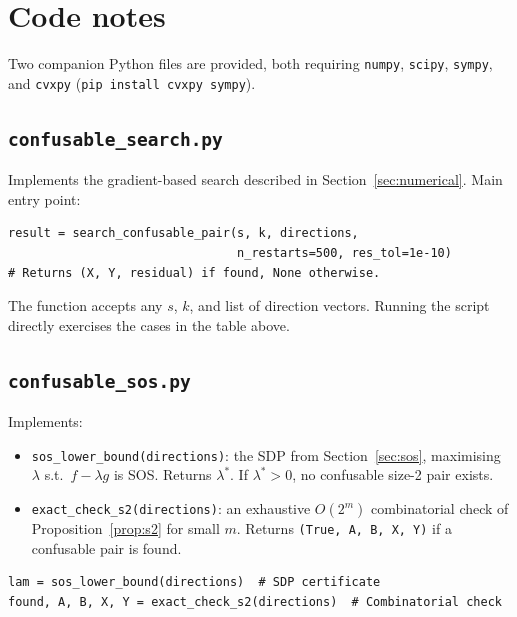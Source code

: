 \documentclass[12pt,a4paper]{article}
\begin{document}
\section{Code notes}
\label{sec:code}

Two companion Python files are provided, both requiring \texttt{numpy},
\texttt{scipy}, \texttt{sympy}, and \texttt{cvxpy} (\texttt{pip install
cvxpy sympy}).

\subsection*{\texttt{confusable\_search.py}}

Implements the gradient-based search described in
Section~\ref{sec:numerical}.  Main entry point:

\begin{lstlisting}
result = search_confusable_pair(s, k, directions,
                                n_restarts=500, res_tol=1e-10)
# Returns (X, Y, residual) if found, None otherwise.
\end{lstlisting}

The function accepts any $s$, $k$, and list of direction vectors.
Running the script directly exercises the cases in the table above.

\subsection*{\texttt{confusable\_sos.py}}

Implements:
\begin{itemize}
  \item \texttt{sos\_lower\_bound(directions)}: the SDP from
    Section~\ref{sec:sos}, maximising $\lambda$ s.t.\ $f - \lambda g$
    is SOS.  Returns $\lambda^*$.  If $\lambda^* > 0$, no confusable
    size-2 pair exists.
  \item \texttt{exact\_check\_s2(directions)}: an exhaustive $O(2^m)$
    combinatorial check of Proposition~\ref{prop:s2} for small $m$.
    Returns \texttt{(True, A, B, X, Y)} if a confusable pair is found.
\end{itemize}

\begin{lstlisting}
lam = sos_lower_bound(directions)  # SDP certificate
found, A, B, X, Y = exact_check_s2(directions)  # Combinatorial check
\end{lstlisting}
\end{document}

